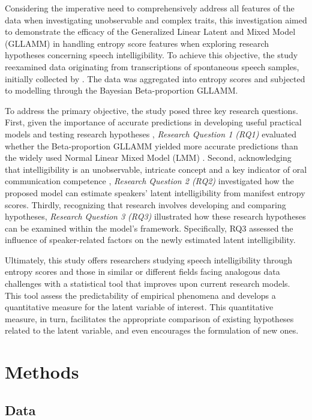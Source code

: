 \documentclass[
  authoryear,
  preprint,
  1p]{elsarticle}
\begin{document}
{Considering the imperative need to comprehensively address all features
of the data when investigating unobservable and complex traits, this
investigation aimed to demonstrate the efficacy of the Generalized
Linear Latent and Mixed Model (GLLAMM) in handling entropy score
features when exploring research hypotheses concerning speech
intelligibility. To achieve this objective, the study reexamined data
originating from transcriptions of spontaneous speech samples, initially
collected by \citet{Boonen_et_al_2023}. The data was aggregated into
entropy scores and subjected to modelling through the Bayesian
Beta-proportion GLLAMM.}

{To address the primary objective, the study posed three key research
questions. First, given the importance of accurate predictions in
developing useful practical models and testing research hypotheses
\citep{Shmueli_et_al_2012}, \emph{Research Question 1 (RQ1)} evaluated
whether the Beta-proportion GLLAMM yielded more accurate predictions
than the widely used Normal Linear Mixed Model (LMM)
\citep{Holmes_et_al_2019}. Second, acknowledging that intelligibility is
an unobservable, intricate concept and a key indicator of oral
communication competence \citep{Kent_et_al_1994}, \emph{Research
Question 2 (RQ2)} investigated how the proposed model can estimate
speakers' latent intelligibility from manifest entropy scores. Thirdly,
recognizing that research involves developing and comparing hypotheses,
\emph{Research Question 3 (RQ3)} illustrated how these research
hypotheses can be examined within the model's framework. Specifically,
RQ3 assessed the influence of speaker-related factors on the newly
estimated latent intelligibility.}

{Ultimately, this study offers researchers studying speech
intelligibility through entropy scores and those in similar or different
fields facing analogous data challenges with a statistical tool that
improves upon current research models. This tool assess the
predictability of empirical phenomena and develops a quantitative
measure for the latent variable of interest. This quantitative measure,
in turn, facilitates the appropriate comparison of existing hypotheses
related to the latent variable, and even encourages the formulation of
new ones.}

\section{Methods}\label{sec-methods}

\subsection{Data}\label{sec-M-D}
\end{document}
